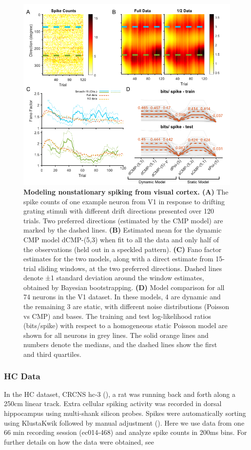 \documentclass[]{article}
\begin{document}
	\begin{figure}[h!]
		\centering
		\includegraphics[width=1\textwidth]{figure4.png}
		\caption{\textbf{Modeling nonstationary spiking from visual cortex. (A)} The spike counts of one example neuron from V1 in response to drifting grating stimuli with different drift directions presented over 120 trials. Two preferred directions (estimated by the CMP model) are marked by the dashed lines. \textbf{(B)} Estimated mean for the dynamic CMP model dCMP-(5,3) when fit to all the data and only half of the observations (held out in a speckled pattern). \textbf{(C)} Fano factor estimates for the two models, along with a direct estimate from 15-trial sliding windows, at the two preferred directions. Dashed lines denote ±1 standard deviation around the window estimates, obtained by Bayesian bootstrapping. \textbf{(D)} Model comparison for all 74 neurons in the V1 dataset. In these models, 4 are dynamic and the remaining 3 are static, with different noise distributions (Poisson vs CMP) and bases. The training and test log-likelihood ratios (bits/spike) with respect to a homogeneous static Poisson model are shown for all neurons in grey lines. The solid orange lines and numbers denote the medians, and the dashed lines show the first and third quartiles.}
		\label{fig4}
	\end{figure}
	
	\subsubsection{HC Data}
	In the HC dataset, CRCNS hc-3 (\cite{Mizuseki2013}), a rat was running back and forth along a 250cm linear track. Extra cellular spiking activity was recorded in dorsal hippocampus using multi-shank silicon probes. Spikes were automatically sorting using KlustaKwik followed by manual adjustment (\cite{Rossant2016}). Here we use data from one 66 min recording session (ec014-468) and analyze spike counts in 200ms bins. For further details on how the data were obtained, see \cite{Mizuseki2014}
	
\end{document}
